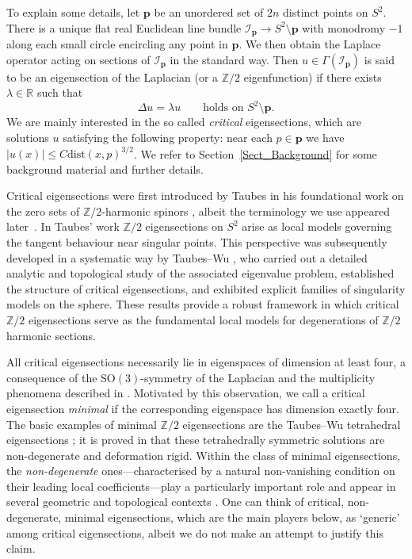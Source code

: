 \documentclass[11pt]{amsart}
\newcommand{\cI}{{\mathcal I}}
\newcommand{\Z}{{\mathbb Z}}
\newcommand{\R}{{\mathbb R}}
\newcommand{\La}{\lambda}
\newcommand{\dist}{\mathrm{dist}}
\newcommand{\mbp}{\mathbf{p}}
\begin{document}
To explain some details, let $\mbp$ be an unordered set of $2n$ distinct points on $S^2$. 
There is a unique flat real Euclidean line bundle $\cI_\mbp\to S^2\setminus\mbp$ with monodromy $-1$ along each small circle encircling any point in $\mbp$. 
We then obtain the Laplace operator acting on sections of $\cI_\mbp$ in the standard way. Then $u\in \Gamma(\cI_\mbp)$ is said to be an eigensection of the Laplacian (or a $\mathbb Z/2$ eigenfunction) if there exists $\La\in\R$ such that
\begin{equation*}
  \Delta u = \La u\qquad\text{holds on } S^2\setminus\mbp.
\end{equation*}
We are mainly interested in the so called \textit{critical} eigensections, which are solutions $u$ satisfying the following property: near each $p\in\mbp$ we have $|u (x)|\le C\dist (x,p)^{3/2}$.  
We refer to Section~\ref{Sect_Background} for some background material and further details. 

  
    
Critical eigensections were first introduced by Taubes in his foundational work on the zero sets of 
$\mathbb Z/2$-harmonic spinors \cite{taubes2014zero}, albeit the terminology we use appeared later~\cite{chen2024existence}. In Taubes' work $\mathbb Z/2$ eigensections 
on $S^2$ arise as local models governing the tangent behaviour near singular points.  
This perspective was subsequently developed in a systematic way by Taubes--Wu 
\cite{taubes2020examples,taubes2021topological}, who carried out a detailed analytic and
topological study of the associated eigenvalue problem, established the structure of
critical eigensections, and exhibited explicit families of singularity models on the sphere.  
These results provide a robust framework in which critical $\mathbb Z/2$ eigensections serve as 
the fundamental local models for degenerations of $\Z/2$ harmonic sections.

All critical eigensections necessarily lie in eigenspaces of dimension at least four, 
a consequence of the $\mathrm{SO}(3)$-symmetry of the Laplacian and the multiplicity
phenomena described in \cite{taubes2020examples,taubes2021topological}.  
Motivated by this observation, we call a critical eigensection \emph{minimal} if the 
corresponding eigenspace has dimension exactly four.  
The basic examples of minimal $\mathbb Z/2$ eigensections are the Taubes--Wu
tetrahedral eigensections \cite{taubes2020examples}; it is proved in
\cite{chen2024existence} that these tetrahedrally symmetric solutions are
non-degenerate and deformation rigid.  
Within the class of minimal eigensections, the \emph{non-degenerate} ones---characterised by a natural 
non-vanishing condition on their leading local coefficients---play a particularly 
important role and appear in several geometric and topological contexts
\cite{donaldson2019deformations,HeParker2024Z2Harmonic,Parker2025DeformationsZ2Spinors}.
One can think of critical, non-degenerate, minimal eigensections, which are the main players below, as `generic' among critical eigensections, albeit we do not make an attempt to justify this claim.  
\end{document}
